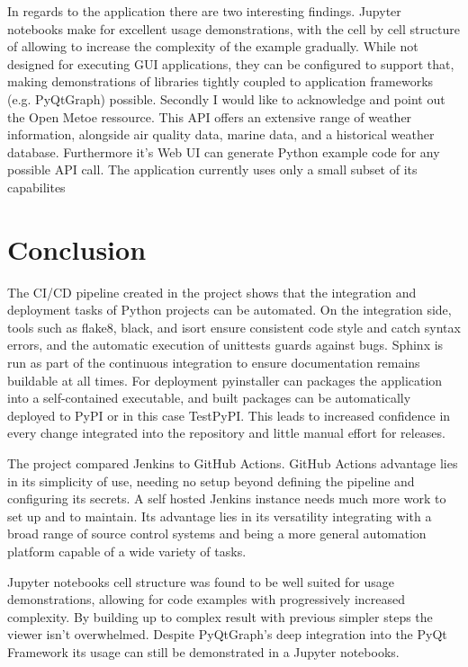 \documentclass{llncs}
\begin{document}
In regards to the application there are two interesting findings.
Jupyter notebooks make for excellent usage demonstrations, with the cell by cell structure of allowing to increase the complexity of the example gradually. While not designed for executing GUI applications, they can be configured to support that, making demonstrations of libraries tightly coupled to application frameworks (e.g. PyQtGraph) possible.
Secondly I would like to acknowledge and point out the Open Metoe ressource. This API offers an extensive range of weather information, alongside air quality data, marine data, and a historical weather database. Furthermore it's Web UI can generate Python example code for any possible API call. The application currently uses only a small subset of its capabilites


\section{Conclusion}

The CI/CD pipeline created in the project shows that the integration and deployment tasks of Python projects can be automated. On the integration side, tools such as flake8, black, and isort ensure consistent code style and catch syntax errors, and the automatic execution of unittests guards against bugs. Sphinx is run as part of the continuous integration to ensure documentation remains buildable at all times. For deployment pyinstaller can packages the application into a self-contained executable, and built packages can be automatically deployed to PyPI or in this case TestPyPI. This leads to increased confidence in every change integrated into the repository and little manual effort for releases.

The project compared Jenkins to GitHub Actions. GitHub Actions advantage lies in its simplicity of use, needing no setup beyond defining the pipeline and configuring its secrets. A self hosted Jenkins instance needs much more work to set up and to maintain. Its advantage lies in its versatility integrating with a broad range of source control systems and being a more general automation platform capable of a wide variety of tasks. 

Jupyter notebooks cell structure was found to be well suited for usage demonstrations, allowing for code examples with progressively increased complexity. By building up to complex result with previous simpler steps the viewer isn't overwhelmed. Despite PyQtGraph's deep integration into the PyQt Framework its usage can still be demonstrated in a Jupyter notebooks.
\end{document}
